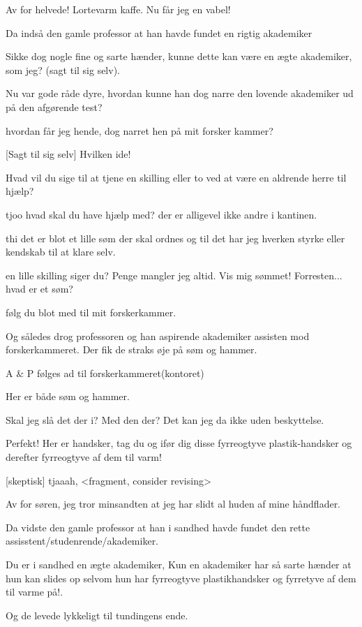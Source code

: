 \documentclass[a4paper,11pt]{article}
\begin{document}
\begin{sketch}

 Av for helvede! Lortevarm kaffe. Nu får jeg en vabel!

 Da indså den gamle professor at han havde fundet en rigtig akademiker

 Sikke dog nogle fine og sarte hænder, kunne dette kan være en ægte akademiker, som jeg? (sagt til sig selv).

 Nu var gode råde dyre, hvordan kunne han dog narre den lovende akademiker ud på den afgørende test?

 hvordan får jeg hende, dog narret hen på mit forsker kammer?

[Sagt til sig selv] Hvilken ide!

 Hvad vil du sige til at tjene en skilling eller to ved at være en aldrende herre til hjælp?

 tjoo hvad skal du have hjælp med? der er alligevel ikke andre i kantinen.

 thi det er blot et lille søm der skal ordnes og til det har jeg hverken styrke eller kendskab til at klare selv.

 en lille skilling siger du? Penge mangler jeg altid. Vis mig sømmet! Forresten... hvad er et søm?

 følg du blot med til mit forskerkammer.

 Og således drog professoren og han aspirende akademiker assisten mod forskerkammeret. Der fik de straks øje på søm og hammer.

\scene A \& P følges ad til forskerkammeret(kontoret)

 Her er både søm og hammer.

 Skal jeg slå det der i? Med den der? Det kan jeg da ikke uden beskyttelse.

 Perfekt! Her er handsker, tag du og ifør dig disse  fyrreogtyve plastik-handsker og derefter fyrreogtyve af dem til varm!

[skeptisk] tjaaah, <fragment, consider revising>


 Av for søren, jeg tror minsandten at jeg har slidt al huden af mine håndflader.

 Da vidste den gamle professor at han i sandhed havde fundet den rette assisstent/studenrende/akademiker.

 Du er i sandhed en ægte akademiker, Kun en akademiker har så sarte hænder at hun kan slides op selvom hun har fyrreogtyve plastikhandsker og fyrretyve af dem til varme på!.

 Og de levede lykkeligt til tundingens ende.



\end{sketch}
\end{document}
